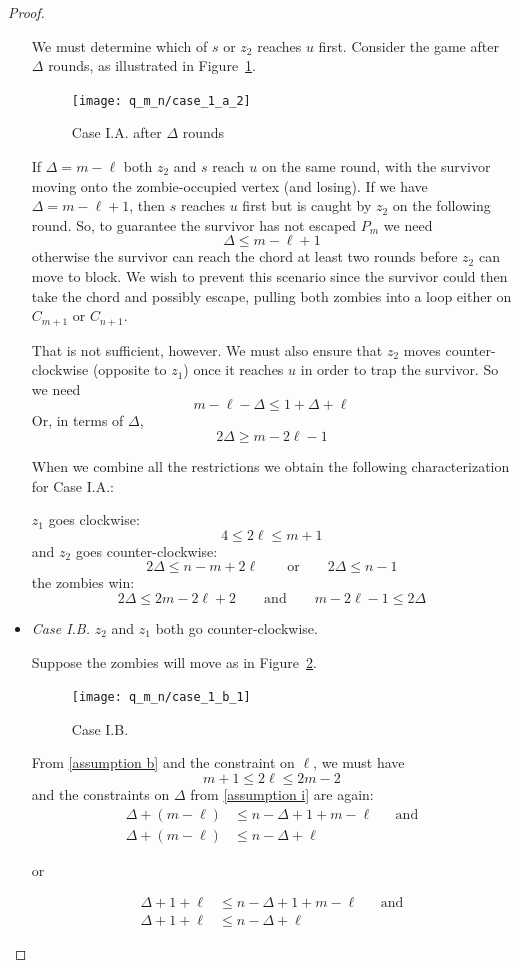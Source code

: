 \begin{proof}
\begin{proofpart}
\begin{itemize}
  We must determine which of $s$ or $z_2$ reaches $u$ first. Consider the game after $\Delta$ rounds, as illustrated in Figure~\ref{fig:case_1_a_2}.

  \begin{figure}
    \centering
    \texttt{[image: q\_m\_n/case\_1\_a\_2]}
    \caption{Case I.A. after $\Delta$ rounds \label{fig:case_1_a_2}}
  \end{figure}

  If $\Delta = m - \ell$ both $z_2$ and $s$ reach $u$ on the same round,
  with the survivor moving onto the zombie-occupied vertex (and losing).
  If we have $\Delta = m - \ell + 1$, then $s$ reaches $u$ first
  but is caught by $z_2$ on the following round.
  So, to guarantee the survivor has not escaped $P_m$ we need
  \[ \Delta \leq m- \ell + 1 \]
  otherwise the survivor can reach the chord at least two rounds
  before $z_2$ can move to block. We wish to prevent this scenario since
  the survivor could then take the chord and possibly escape, pulling
  both zombies into a loop either on $C_{m+1}$ or $C_{n+1}$.

  That is not sufficient, however. We must also ensure that $z_2$ moves
  counter-clockwise (opposite to $z_1$) once it reaches $u$ in order to trap the
  survivor. So we need
  \[ m - \ell - \Delta \leq 1 + \Delta + \ell \]
  Or, in terms of $\Delta$,
  \[ 2 \Delta \geq m - 2\ell  -1 \]

  When we combine all the restrictions we obtain the following characterization for Case I.A.:

  $z_1$ goes clockwise:
  \[ 4 \leq 2 \ell \leq m + 1 \]
  and $z_2$ goes counter-clockwise:
  \[ 2 \Delta \leq n - m + 2\ell \qquad \text{or} \qquad 2 \Delta \leq n - 1 \]
  the zombies win:
  \[ 2 \Delta \leq 2 m- 2 \ell + 2 \qquad \text{and} \qquad m - 2\ell  -1 \leq 2 \Delta \]

  \item \textit{Case I.B.} $z_2$ and $z_1$ both go counter-clockwise.

  Suppose the zombies will move as in Figure~\ref{fig:case_1_b_1}.
  \begin{figure}
    \centering
    \texttt{[image: q\_m\_n/case\_1\_b\_1]}
    \caption{Case I.B. \label{fig:case_1_b_1}}
  \end{figure}

  From \ref{assumption b} and the constraint on $\ell$, we must have
  \[ m + 1 \leq 2 \ell \leq 2m - 2 \]
  and the constraints on $\Delta$ from \ref{assumption i} are again:
  \begin{align*}
   \Delta + (m - \ell) &\leq n - \Delta + 1 + m - \ell && \text{and} \\
   \Delta + (m - \ell) &\leq n - \Delta + \ell
  \end{align*}
  \begin{center}or\end{center}
  \begin{align*}
   \Delta + 1 + \ell &\leq n - \Delta + 1 + m - \ell && \text{and} \\
   \Delta + 1 + \ell &\leq n - \Delta + \ell
  \end{align*}


\end{itemize}
\end{proofpart}
\end{proof}
